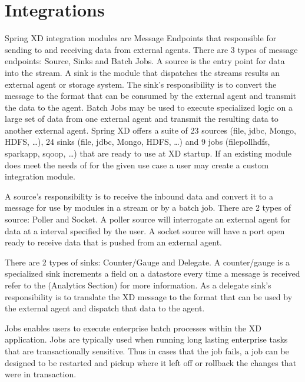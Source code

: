\section{Integrations}
Spring XD integration modules are Message Endpoints \cite{enterprise-inetgration-pattern} 
that responsible for sending to and receiving data from external agents.  
There are 3 types of message endpoints: Source, Sinks and Batch Jobs.  
A source is the entry point for data into the stream. A sink is the module that dispatches 
the streams results an external agent or storage system.
The sink's responsibility is to convert the message to the format that can be consumed by 
the external agent and transmit the data to the agent. 
Batch Jobs may be used to execute specialized logic on a large set of data from one 
external agent and transmit the resulting data to another external
agent.  Spring XD offers a suite of 23 sources (file, jdbc, Mongo, HDFS, \ldots), 24 sinks
 (file, jdbc, Mongo, HDFS, \ldots) and 9 jobs
(filepollhdfs, sparkapp, sqoop, \ldots)  that are ready to use at XD startup.  
If an existing module does meet the needs of for the given use case a user may create a 
custom integration module.\par

A source's responsibility is to receive the inbound data and convert it to a message for 
use by modules in a stream or by a batch job.  
There are 2 types of source: Poller and Socket.  A poller source will interrogate an 
external agent for data at a interval specified by the user.  
A socket source will have a port open ready to receive data that is pushed from an
 external agent.  \par

There are 2 types of sinks: Counter/Gauge and Delegate.  
A counter/gauge is a specialized sink increments a field on a datastore every time a 
message is received refer to the (Analytics Section) 
for more information.  As a delegate sink's responsibility is to translate the XD message
to the format that can be used by the external agent and dispatch that data to the agent. \par  

Jobs enables users to execute enterprise batch processes within the XD application. 
Jobs are typically used when running long lasting enterprise tasks that are transactionally 
sensitive.  Thus in cases that the job fails, a job can be designed to be restarted and 
pickup where it left off or rollback the changes that were in transaction.\par
